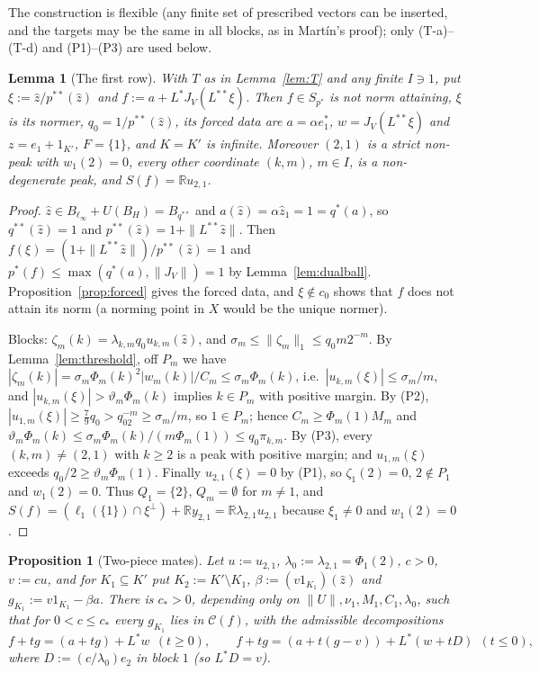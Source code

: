 \documentclass[10pt]{amsart}
\newtheorem{lemma}[theorem]{Lemma}
\newtheorem{proposition}[theorem]{Proposition}
\theoremstyle{definition}
\theoremstyle{remark}
\newcommand{\R}{\mathbb R}
\newcommand{\Cset}{\mathcal C}
\newcommand{\zh}{\hat z}
\begin{document}
The construction is flexible (any finite set of prescribed vectors can be
inserted, and the targets may be the same in all blocks, as in Mart\'in's
proof); only (T-a)--(T-d) and (P1)--(P3) are used below.

\begin{lemma}[The first row]\label{lem:firstrow}
With $T$ as in Lemma~\ref{lem:T} and any finite $I\ni1$, put
$\xi:=\zh/p^{**}(\zh)$ and $f:=a+L^*J_V(L^{**}\xi)$.  Then $f\in S_{p^*}$ is
not norm attaining, $\xi$ is its normer, $q_0=1/p^{**}(\zh)$, its forced data
are $a=\alpha e_1^*$, $w=J_V(L^{**}\xi)$ and $z=e_1+1_{K'}$, $F=\{1\}$, and
$K=K'$ is infinite.  Moreover $(2,1)$ is a strict non-peak with $w_1(2)=0$,
every other coordinate $(k,m)$, $m\in I$, is a non-degenerate peak, and
$S(f)=\R u_{2,1}$.
\end{lemma}

\begin{proof}
$\zh\in B_{\ell_\infty}+U(B_H)=B_{q^{**}}$ and $a(\zh)=\alpha\zh_1=1=q^*(a)$,
so $q^{**}(\zh)=1$ and $p^{**}(\zh)=1+\|L^{**}\zh\|$.  Then
$f(\xi)=(1+\|L^{**}\zh\|)/p^{**}(\zh)=1$ and $p^*(f)\le\max(q^*(a),\|J_V\|)
=1$ by Lemma~\ref{lem:dualball}.  Proposition~\ref{prop:forced} gives the
forced data, and $\xi\notin c_0$ shows that $f$ does not attain its norm
(a norming point in $X$ would be the unique normer).

Blocks: $\zeta_m(k)=\lambda_{k,m}q_0u_{k,m}(\zh)$, and
$\sigma_m\le\|\zeta_m\|_1\le q_0m2^{-m}$.  By Lemma~\ref{lem:threshold},
off $P_m$ we have $|\zeta_m(k)|=\sigma_m\Phi_m(k)^2|w_m(k)|/C_m\le\sigma_m
\Phi_m(k)$, i.e.\ $|u_{k,m}(\xi)|\le\sigma_m/m$, and
$|u_{k,m}(\xi)|>\vartheta_m\Phi_m(k)$ implies $k\in P_m$ with positive
margin.  By (P2), $|u_{1,m}(\xi)|\ge\frac79q_0>q_02^{-m}\ge\sigma_m/m$, so
$1\in P_m$; hence $C_m\ge\Phi_m(1)M_m$ and
$\vartheta_m\Phi_m(k)\le\sigma_m\Phi_m(k)/(m\Phi_m(1))\le q_0\pi_{k,m}$.  By
(P3), every $(k,m)\ne(2,1)$ with $k\ge2$ is a peak with positive margin; and
$u_{1,m}(\xi)$ exceeds $q_0/2\ge\vartheta_m\Phi_m(1)$.  Finally
$u_{2,1}(\xi)=0$ by (P1), so $\zeta_1(2)=0$, $2\notin P_1$ and
$w_1(2)=0$.  Thus $Q_1=\{2\}$, $Q_m=\emptyset$ for $m\ne1$, and
$S(f)=(\ell_1(\{1\})\cap\xi^\perp)+\R y_{2,1}=\R\lambda_{2,1}u_{2,1}$
because $\xi_1\ne0$ and $w_1(2)=0$.
\end{proof}

\begin{proposition}[Two-piece mates]\label{prop:twopiece}
Let $u:=u_{2,1}$, $\lambda_0:=\lambda_{2,1}=\Phi_1(2)$, $c>0$, $v:=cu$, and for
$K_1\subseteq K'$ put $K_2:=K'\setminus K_1$,
$\beta:=(v1_{K_1})(\zh)$ and $g_{K_1}:=v1_{K_1}-\beta a$.  There is $c_*>0$,
depending only on $\|U\|,\nu_1,M_1,C_1,\lambda_0$, such that for $0<c\le c_*$
every $g_{K_1}$ lies in $\Cset(f)$, with the admissible decompositions
\[
 f+tg=(a+tg)+L^*w\ \ (t\ge0),\qquad
 f+tg=(a+t(g-v))+L^*(w+tD)\ \ (t\le0),
\]
where $D:=(c/\lambda_0)e_2$ in block $1$ \textup{(}so $L^*D=v$\textup{)}.
\end{proposition}
\end{document}
